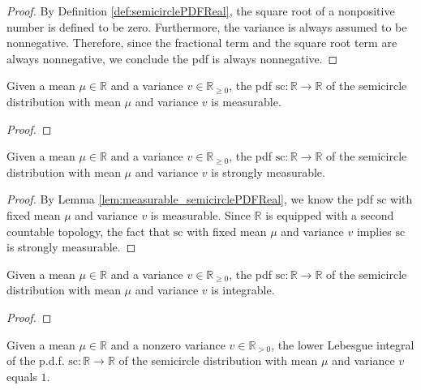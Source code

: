 \begin{proof}
   By Definition \ref{def:semicirclePDFReal}, the square root of a nonpositive number is defined to be zero.
   Furthermore, the variance is always assumed to be nonnegative.
   Therefore, since the fractional term and the square root term are always nonnegative,
   we conclude the pdf is always nonnegative.
\end{proof}
\begin{lemma}\label{lem:measurable_semicirclePDFReal}
    \uses{}
    Given a mean $\mu \in \mathbb{R}$ and a variance $v \in \mathbb{R}_{\geq 0}$, the pdf $\mathrm{sc} : \mathbb{R} \rightarrow \mathbb{R}$
    of the semicircle distribution with mean $\mu$ and variance $v$ is measurable.
\end{lemma}
\begin{proof}
\end{proof}
\begin{lemma}\label{lem:stronglyMeasurable_semicirclePDFReal}
    \leanok
    Given a mean $\mu \in \mathbb{R}$ and a variance $v \in \mathbb{R}_{\geq 0}$, the pdf $\mathrm{sc} : \mathbb{R} \rightarrow \mathbb{R}$
    of the semicircle distribution with mean $\mu$ and variance $v$ is strongly measurable.
\end{lemma}
\begin{proof}
    By Lemma \ref{lem:measurable_semicirclePDFReal}, we know the pdf $\mathrm{sc}$ with fixed mean $\mu$ and variance $v$ is measurable.
    Since $\mathbb{R}$ is equipped with a second countable topology, the fact that $\mathrm{sc}$ with fixed mean $\mu$ and variance $v$ implies $\mathrm{sc}$ is strongly measurable.
\end{proof}
\begin{lemma}\label{lem:integrable_semicirclePDFReal}
    Given a mean $\mu \in \mathbb{R}$ and a variance $v \in \mathbb{R}_{\geq 0}$, the pdf $\mathrm{sc} : \mathbb{R} \rightarrow \mathbb{R}$
    of the semicircle distribution with mean $\mu$ and variance $v$ is integrable.
\end{lemma}
\begin{proof}
\end{proof}
\begin{lemma}\label{lem:lintegral_semicirclePDFReal_eq_one}
    Given a mean $\mu \in \mathbb{R}$ and a nonzero variance $v \in \mathbb{R}_{> 0}$, the lower Lebesgue integral of the p.d.f. $\mathrm{sc} : \mathbb{R} \rightarrow \mathbb{R}$
    of the semicircle distribution with mean $\mu$ and variance $v$ equals $1$.
\end{lemma}
